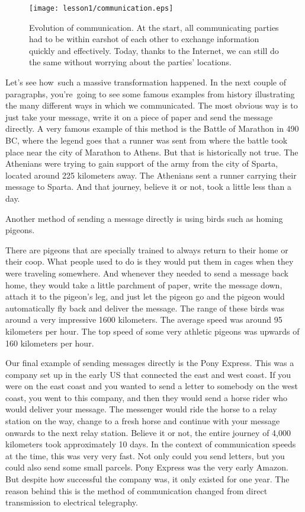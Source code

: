 \begin{figure}[h]
    \centering
    \texttt{[image: lesson1/communication.eps]}
    \caption[Evolution of communication]{Evolution of communication. At the start, all communicating parties had to be within earshot of each other to exchange information quickly and effectively. Today, thanks to the Internet, we can still do the same without worrying about the parties' locations.}
    \label{fig:1-1_communication}
\end{figure}

Let's see how such a massive transformation happened.
In the next couple of paragraphs, you're going to see some famous examples from history illustrating the many different ways in which we communicated.
The most obvious way is to just take your message, write it on a piece of paper and send the message directly.
A very famous example of this method is the Battle of Marathon in 490 BC, where the legend goes that a runner was sent from where the battle took place near the city of Marathon to Athens.
But that is historically not true.
The Athenians were trying to gain support of the army from the city of Sparta, located around 225 kilometers away.
The Athenians sent a runner carrying their message to Sparta.
And that journey, believe it or not, took a little less than a day.

Another method of sending a message directly is using birds such as homing pigeons.

There are pigeons that are specially trained to always return to their home or their coop. What people used to do is they would put them in cages when they were traveling somewhere. And whenever they needed to send a message back home, they would take a little parchment of paper, write the message down, attach it to the pigeon's leg, and just let the pigeon go and the pigeon would automatically fly back and deliver the message.
The range of these birds was around a very impressive 1600 kilometers.
The average speed was around 95 kilometers per hour.
The top speed of some very athletic pigeons was upwards of 160 kilometers per hour.

Our final example of sending messages directly is the Pony Express.
This was a company set up in the early US that connected the east and west coast.
If you were on the east coast and you wanted to send a letter to somebody on the west coast, you went to this company, and then they would send a horse rider who would deliver your message.
The messenger would ride the horse to a relay station on the way, change to a fresh horse and continue with your message onwards to the next relay station.
Believe it or not, the entire journey of 4,000 kilometers took approximately 10 days.
In the context of communication speeds at the time, this was very very fast.
Not only could you send letters, but you could also send some small parcels.
Pony Express was the very early Amazon.
But despite how successful the company was, it only existed for one year.
The reason behind this is the method of communication changed from direct transmission to electrical telegraphy.

